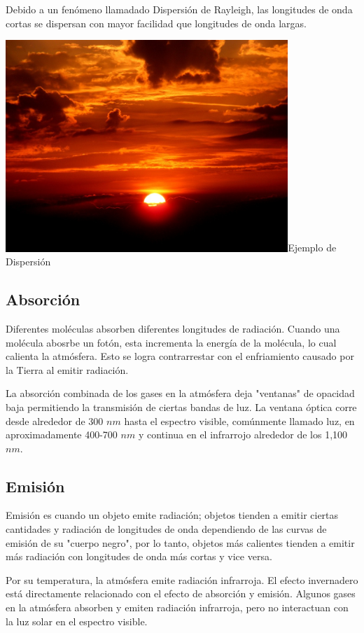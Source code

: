 \documentclass{article} %
\begin{document}
    Debido a un fenómeno llamadado Dispersión de Rayleigh, las longitudes de onda cortas se dispersan con mayor facilidad que longitudes de onda largas.
    
\includegraphics[height=8cm]{sunset.jpg}{Ejemplo de Dispersión}

    \subsection{Absorción}
    Diferentes moléculas absorben diferentes longitudes de radiación. Cuando una molécula abosrbe un fotón, esta incrementa la energía de la molécula, lo cual calienta la atmósfera. Esto se logra contrarrestar con el enfriamiento causado por la Tierra al emitir radiación.
    
    La absorción combinada de los gases en la atmósfera deja "ventanas" de opacidad baja permitiendo la transmisión de ciertas bandas de luz. La ventana óptica corre desde alrededor de 300 $nm$ hasta el espectro visible, comúnmente llamado luz, en aproximadamente 400-700 $nm$ y continua en el infrarrojo alrededor de los 1,100 $nm$.
    
    \subsection{Emisión}
    Emisión es cuando un objeto emite radiación; objetos tienden a emitir ciertas cantidades y radiación de longitudes de onda dependiendo de las curvas de emisión de su "cuerpo negro", por lo tanto, objetos más calientes tienden a emitir más radiación con longitudes de onda más cortas y vice versa.
    
    Por su temperatura, la atmósfera emite radiación infrarroja. El efecto invernadero está directamente relacionado con el efecto de absorción y emisión. Algunos gases en la atmósfera absorben y emiten radiación infrarroja, pero no interactuan con la luz solar en el espectro visible.
\end{document}

